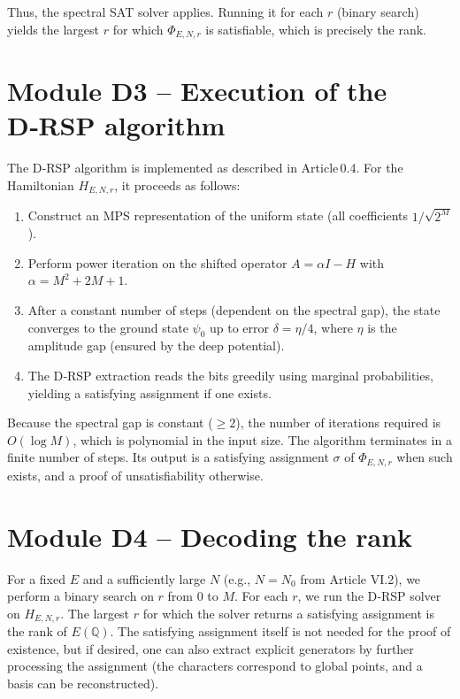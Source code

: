 \documentclass[11pt,a4paper]{article}
\begin{document}
Thus, the spectral SAT solver applies. Running it for each \(r\) (binary search) yields the largest \(r\) for which \(\Phi_{E,N,r}\) is satisfiable, which is precisely the rank.

\section{Module D3 – Execution of the D‑RSP algorithm}

The D‑RSP algorithm is implemented as described in Article 0.4. For the Hamiltonian \(H_{E,N,r}\), it proceeds as follows:

\begin{enumerate}
\item Construct an MPS representation of the uniform state (all coefficients \(1/\sqrt{2^M}\)).
\item Perform power iteration on the shifted operator \(A = \alpha I - H\) with \(\alpha = M^2 + 2M + 1\).
\item After a constant number of steps (dependent on the spectral gap), the state converges to the ground state \(\psi_0\) up to error \(\delta = \eta/4\), where \(\eta\) is the amplitude gap (ensured by the deep potential).
\item The D‑RSP extraction reads the bits greedily using marginal probabilities, yielding a satisfying assignment if one exists.
\end{enumerate}

Because the spectral gap is constant (\( \ge 2\)), the number of iterations required is \(O(\log M)\), which is polynomial in the input size. The algorithm terminates in a finite number of steps. Its output is a satisfying assignment \(\sigma\) of \(\Phi_{E,N,r}\) when such exists, and a proof of unsatisfiability otherwise.

\section{Module D4 – Decoding the rank}

For a fixed \(E\) and a sufficiently large \(N\) (e.g., \(N = N_0\) from Article VI.2), we perform a binary search on \(r\) from \(0\) to \(M\). For each \(r\), we run the D‑RSP solver on \(H_{E,N,r}\). The largest \(r\) for which the solver returns a satisfying assignment is the rank of \(E(\mathbb{Q})\). The satisfying assignment itself is not needed for the proof of existence, but if desired, one can also extract explicit generators by further processing the assignment (the characters correspond to global points, and a basis can be reconstructed).
\end{document}
